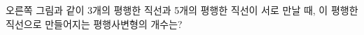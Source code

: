 \noindent\begin{minipage}[t]{0.58\linewidth}\vspace{0pt}\raggedright 오른쪽 그림과 같이 3개의 평행한 직선과 5개의 평행한 직선이 서로 만날 때, 이 평행한 직선으로 만들어지는 평행사변형의 개수는?\end{minipage}\hfill\begin{minipage}[t]{0.4\linewidth}\vspace{0pt}\centering \resizebox{\ifdim\width>\linewidth\linewidth\else\width\fi}{!}{}\end{minipage}\par
{}

